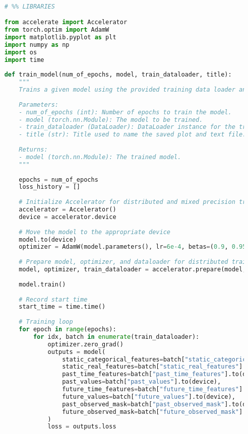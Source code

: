 \begin{lstlisting}[language=Python, caption={Code for training the forecasting model}, breaklines=true, label=code5]

    # %% LIBRARIES

    from accelerate import Accelerator
    from torch.optim import AdamW
    import matplotlib.pyplot as plt
    import numpy as np
    import os
    import time
    
    def train_model(num_of_epochs, model, train_dataloader, title):
        """
        Trains a given model using the provided training data loader and saves the training loss over iterations.
        
        Parameters:
        - num_of_epochs (int): Number of epochs to train the model.
        - model (torch.nn.Module): The model to be trained.
        - train_dataloader (DataLoader): DataLoader instance for the training data.
        - title (str): Title used to name the saved plot and text file.
        
        Returns:
        - model (torch.nn.Module): The trained model.
        """
        
        epochs = num_of_epochs
        loss_history = []
    
        # Initialize Accelerator for distributed and mixed precision training
        accelerator = Accelerator()
        device = accelerator.device
    
        # Move the model to the appropriate device
        model.to(device)
        optimizer = AdamW(model.parameters(), lr=6e-4, betas=(0.9, 0.95), weight_decay=1e-1)
    
        # Prepare model, optimizer, and dataloader for distributed training
        model, optimizer, train_dataloader = accelerator.prepare(model, optimizer, train_dataloader)
    
        model.train()
        
        # Record start time
        start_time = time.time()
    
        # Training loop
        for epoch in range(epochs):
            for idx, batch in enumerate(train_dataloader):
                optimizer.zero_grad()
                outputs = model(
                    static_categorical_features=batch["static_categorical_features"].to(device) if model.config.num_static_categorical_features > 0 else None,
                    static_real_features=batch["static_real_features"].to(device) if model.config.num_static_real_features > 0 else None,
                    past_time_features=batch["past_time_features"].to(device),
                    past_values=batch["past_values"].to(device),
                    future_time_features=batch["future_time_features"].to(device),
                    future_values=batch["future_values"].to(device),
                    past_observed_mask=batch["past_observed_mask"].to(device),
                    future_observed_mask=batch["future_observed_mask"].to(device),
                )
                loss = outputs.loss
    

\end{lstlisting}
